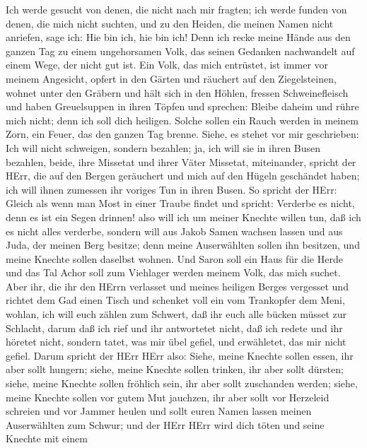  Ich werde gesucht von denen, die nicht nach mir fragten;
ich werde funden von denen, die mich nicht suchten, und zu den Heiden,
die meinen Namen nicht anriefen, sage ich: Hie bin ich, hie bin ich!
 Denn ich recke meine Hände aus den ganzen Tag zu einem
ungehorsamen Volk, das seinen Gedanken nachwandelt auf einem Wege, der
nicht gut ist.  Ein Volk, das mich entrüstet, ist immer vor
meinem Angesicht, opfert in den Gärten und räuchert auf den
Ziegelsteinen,  wohnet unter den Gräbern und hält sich in
den Höhlen, fressen Schweinefleisch und haben Greuelsuppen in ihren
Töpfen  und sprechen: Bleibe daheim und rühre mich nicht;
denn ich soll dich heiligen. Solche sollen ein Rauch werden in meinem
Zorn, ein Feuer, das den ganzen Tag brenne.  Siehe, es
stehet vor mir geschrieben: Ich will nicht schweigen, sondern bezahlen;
ja, ich will sie in ihren Busen bezahlen,  beide, ihre
Missetat und ihrer Väter Missetat, miteinander, spricht der HErr, die
auf den Bergen geräuchert und mich auf den Hügeln geschändet haben; ich
will ihnen zumessen ihr voriges Tun in ihren Busen.  So
spricht der HErr: Gleich als wenn man Most in einer Traube findet und
spricht: Verderbe es nicht, denn es ist ein Segen drinnen! also will ich
um meiner Knechte willen tun, daß ich es nicht alles verderbe,
 sondern will aus Jakob Samen wachsen lassen und aus Juda,
der meinen Berg besitze; denn meine Auserwählten sollen ihn besitzen,
und meine Knechte sollen daselbst wohnen.  Und Saron soll
ein Haus für die Herde und das Tal Achor soll zum Viehlager werden
meinem Volk, das mich suchet.  Aber ihr, die ihr den HErrn
verlasset und meines heiligen Berges vergesset und richtet dem Gad einen
Tisch und schenket voll ein vom Trankopfer dem Meni, 
wohlan, ich will euch zählen zum Schwert, daß ihr euch alle bücken
müsset zur Schlacht, darum daß ich rief und ihr antwortetet nicht, daß
ich redete und ihr höretet nicht, sondern tatet, was mir übel gefiel,
und erwähletet, das mir nicht gefiel.  Darum spricht der
HErr HErr also: Siehe, meine Knechte sollen essen, ihr aber sollt
hungern; siehe, meine Knechte sollen trinken, ihr aber sollt dürsten;
siehe, meine Knechte sollen fröhlich sein, ihr aber sollt zuschanden
werden;  siehe, meine Knechte sollen vor gutem Mut
jauchzen, ihr aber sollt vor Herzeleid schreien und vor Jammer heulen
 und sollt euren Namen lassen meinen Auserwählten zum
Schwur; und der HErr HErr wird dich töten und seine Knechte mit einem
